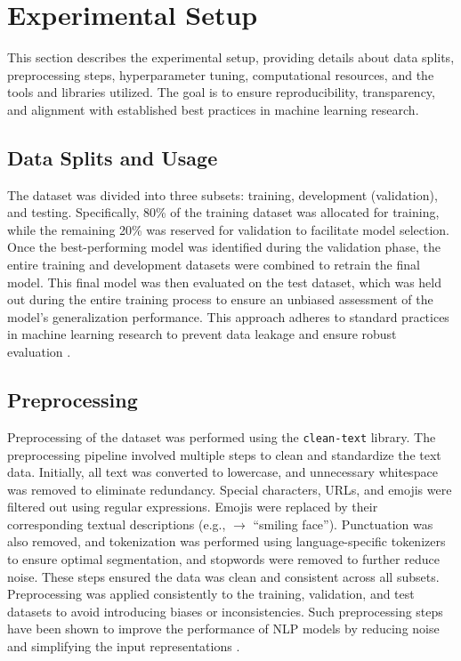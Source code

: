 \section{Experimental Setup}

This section describes the experimental setup, providing details about data splits, preprocessing steps, hyperparameter tuning, computational resources, and the tools and libraries utilized. The goal is to ensure reproducibility, transparency, and alignment with established best practices in machine learning research.



\subsection{Data Splits and Usage}
The dataset\cite{muhammad2025brighterbridginggaphumanannotated} was divided into three subsets: training, development (validation), and testing. Specifically, 80\% of the training dataset was allocated for training, while the remaining 20\% was reserved for validation to facilitate model selection. Once the best-performing model was identified during the validation phase, the entire training and development datasets were combined to retrain the final model. This final model was then evaluated on the test dataset, which was held out during the entire training process to ensure an unbiased assessment of the model's generalization performance. This approach adheres to standard practices in machine learning research to prevent data leakage and ensure robust evaluation \citep{Goodfellow-et-al-2016}.

\subsection{Preprocessing}

Preprocessing of the dataset was performed using the \texttt{clean-text} library. The preprocessing pipeline involved multiple steps to clean and standardize the text data. Initially, all text was converted to lowercase, and unnecessary whitespace was removed to eliminate redundancy. Special characters, URLs, and emojis were filtered out using regular expressions. Emojis were replaced by their corresponding textual descriptions (e.g., \smiley $\rightarrow$ ``smiling face''). Punctuation was also removed, and  tokenization was performed using language-specific tokenizers to ensure optimal segmentation, and stopwords were removed to further reduce noise. These steps ensured the data was clean and consistent across all subsets. Preprocessing was applied consistently to the training, validation, and test datasets to avoid introducing biases or inconsistencies. Such preprocessing steps have been shown to improve the performance of NLP models by reducing noise and simplifying the input representations \citep{Zhang2020DataPrep}.

